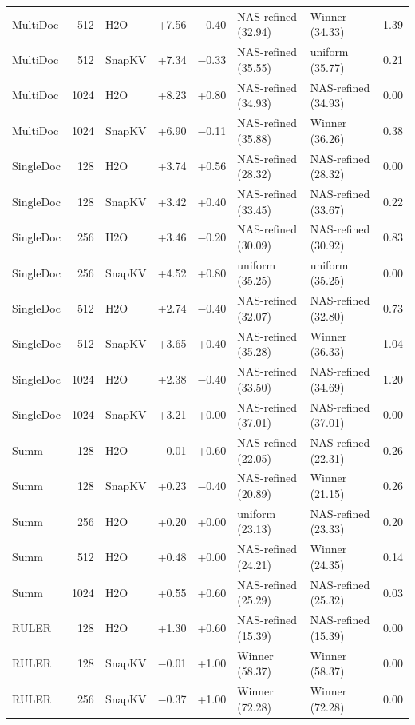 \begin{table}[t]
\begin{tabular}{@{}l r l r r l l r@{}}
    MultiDoc & 512 & H2O & +7.56 & $-$0.40 & NAS-refined (32.94) & Winner (34.33) & 1.39 \\
    MultiDoc & 512 & SnapKV & +7.34 & $-$0.33 & NAS-refined (35.55) & uniform (35.77) & 0.21 \\
    MultiDoc & 1024 & H2O & +8.23 & +0.80 & NAS-refined (34.93) & NAS-refined (34.93) & 0.00 \\
    MultiDoc & 1024 & SnapKV & +6.90 & $-$0.11 & NAS-refined (35.88) & Winner (36.26) & 0.38 \\
    SingleDoc & 128 & H2O & +3.74 & +0.56 & NAS-refined (28.32) & NAS-refined (28.32) & 0.00 \\
    SingleDoc & 128 & SnapKV & +3.42 & +0.40 & NAS-refined (33.45) & NAS-refined (33.67) & 0.22 \\
    SingleDoc & 256 & H2O & +3.46 & $-$0.20 & NAS-refined (30.09) & NAS-refined (30.92) & 0.83 \\
    SingleDoc & 256 & SnapKV & +4.52 & +0.80 & uniform (35.25) & uniform (35.25) & 0.00 \\
    SingleDoc & 512 & H2O & +2.74 & $-$0.40 & NAS-refined (32.07) & NAS-refined (32.80) & 0.73 \\
    SingleDoc & 512 & SnapKV & +3.65 & +0.40 & NAS-refined (35.28) & Winner (36.33) & 1.04 \\
    SingleDoc & 1024 & H2O & +2.38 & $-$0.40 & NAS-refined (33.50) & NAS-refined (34.69) & 1.20 \\
    SingleDoc & 1024 & SnapKV & +3.21 & +0.00 & NAS-refined (37.01) & NAS-refined (37.01) & 0.00 \\
    Summ & 128 & H2O & $-$0.01 & +0.60 & NAS-refined (22.05) & NAS-refined (22.31) & 0.26 \\
    Summ & 128 & SnapKV & +0.23 & $-$0.40 & NAS-refined (20.89) & Winner (21.15) & 0.26 \\
    Summ & 256 & H2O & +0.20 & +0.00 & uniform (23.13) & NAS-refined (23.33) & 0.20 \\
    Summ & 512 & H2O & +0.48 & +0.00 & NAS-refined (24.21) & Winner (24.35) & 0.14 \\
    Summ & 1024 & H2O & +0.55 & +0.60 & NAS-refined (25.29) & NAS-refined (25.32) & 0.03 \\
    RULER & 128 & H2O & +1.30 & +0.60 & NAS-refined (15.39) & NAS-refined (15.39) & 0.00 \\
    RULER & 128 & SnapKV & $-$0.01 & +1.00 & Winner (58.37) & Winner (58.37) & 0.00 \\
    RULER & 256 & SnapKV & $-$0.37 & +1.00 & Winner (72.28) & Winner (72.28) & 0.00 \\

\end{tabular}
\end{table}
